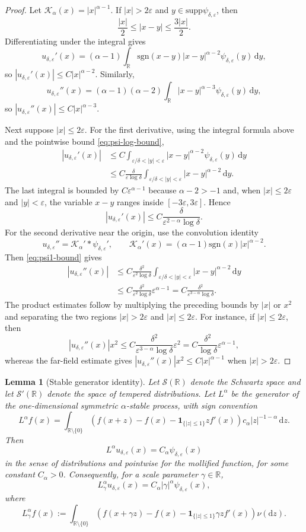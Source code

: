 \documentclass[11pt]{article}
\newtheorem{lemma}[theorem]{Lemma}
\newcommand{\R}{\mathbb{R}}
\newcommand{\1}{\mathbf{1}}
\newcommand{\dd}{\,\mathrm{d}}
\newcommand{\md}{\mathrm{d}}
\newcommand{\eps}{\varepsilon}
\newcommand{\sgn}{\mathrm{sgn}}
\newcommand{\supp}{\mathrm{supp}}
\newcommand{\RieszK}{\mathcal K_\alpha}
\begin{document}
\begin{proof}
Let $\RieszK(x)=|x|^{\alpha-1}$. If $|x|>2\eps$ and $y\in\supp\psi_{\delta,\eps}$, then
\[
  \frac{|x|}{2}\le |x-y|\le \frac{3|x|}{2}.
\]
Differentiating under the integral gives
\[
  u_{\delta,\eps}'(x)=(\alpha-1)\int_\R \sgn(x-y)|x-y|^{\alpha-2}\psi_{\delta,\eps}(y)\dd y,
\]
so $|u_{\delta,\eps}'(x)|\le C|x|^{\alpha-2}$. Similarly,
\[
  u_{\delta,\eps}''(x)=(\alpha-1)(\alpha-2)\int_\R |x-y|^{\alpha-3}\psi_{\delta,\eps}(y)\dd y,
\]
so $|u_{\delta,\eps}''(x)|\le C|x|^{\alpha-3}$.

Next suppose $|x|\le2\eps$. For the first derivative, using the integral formula above and the pointwise bound \eqref{eq:psi-log-bound},
\begin{align*}
|u_{\delta,\eps}'(x)|
&\le C\int_{\eps/\delta<|y|<\eps}|x-y|^{\alpha-2}\psi_{\delta,\eps}(y)\dd y\\
&\le C\frac{\delta}{\eps\log\delta}
\int_{\eps/\delta<|y|<\eps}|x-y|^{\alpha-2}\dd y.
\end{align*}
The last integral is bounded by $C\eps^{\alpha-1}$ because $\alpha-2>-1$ and, when $|x|\le2\eps$ and $|y|<\eps$, the variable $x-y$ ranges inside $[-3\eps,3\eps]$. Hence
\[
|u_{\delta,\eps}'(x)|\le C\frac{\delta}{\eps^{2-\alpha}\log\delta}.
\]
For the second derivative near the origin, use the convolution identity
\[
  u_{\delta,\eps}''=\RieszK' * \psi_{\delta,\eps}',
  \qquad \RieszK'(x)=(\alpha-1)\sgn(x)|x|^{\alpha-2}.
\]
Then \eqref{eq:psi1-bound} gives
\begin{align*}
|u_{\delta,\eps}''(x)|
&\le C\frac{\delta^2}{\eps^2\log\delta}
\int_{\eps/\delta<|y|<\eps}|x-y|^{\alpha-2}\dd y\\
&\le C\frac{\delta^2}{\eps^2\log\delta}\eps^{\alpha-1}
= C\frac{\delta^2}{\eps^{3-\alpha}\log\delta}.
\end{align*}
The product estimates follow by multiplying the preceding bounds by $|x|$ or $x^2$ and separating the two regions $|x|>2\eps$ and $|x|\le2\eps$. For instance, if $|x|\le2\eps$, then
\[
  |u_{\delta,\eps}''(x)|x^2
  \le C\frac{\delta^2}{\eps^{3-\alpha}\log\delta}\eps^2
  =C\frac{\delta^2}{\log\delta}\eps^{\alpha-1},
\]
whereas the far-field estimate gives $|u_{\delta,\eps}''(x)|x^2\le C|x|^{\alpha-1}$ when $|x|>2\eps$.
\end{proof}


\begin{lemma}[Stable generator identity]\label{lem:stable-generator}
Let $\mathcal S(\R)$ denote the Schwartz space and let $\mathcal S'(\R)$ denote the space of tempered distributions. Let $L^\alpha$ be the generator of the one-dimensional symmetric $\alpha$-stable process, with sign convention
\[
L^\alpha f(x)=\int_{\R\setminus\{0\}}\left(f(x+z)-f(x)-\1_{\{|z|\le1\}}zf'(x)\right)c_\alpha |z|^{-1-\alpha}\dd z.
\]
Then
\[
  L^\alpha u_{\delta,\eps}(x)=C_\alpha\psi_{\delta,\eps}(x)
\]
in the sense of distributions and pointwise for the mollified function, for some constant $C_\alpha>0$. Consequently, for a scale parameter $\gamma\in\R$,
\[
  L^\alpha_\gamma u_{\delta,\eps}(x)=C_\alpha |\gamma|^\alpha\psi_{\delta,\eps}(x),
\]
where
\[
L^\alpha_\gamma f(x):=\int_{\R\setminus\{0\}}\left(f(x+\gamma z)-f(x)-\1_{\{|z|\le1\}}\gamma z f'(x)\right)\nu(\md z).
\]
\end{lemma}
\end{document}
